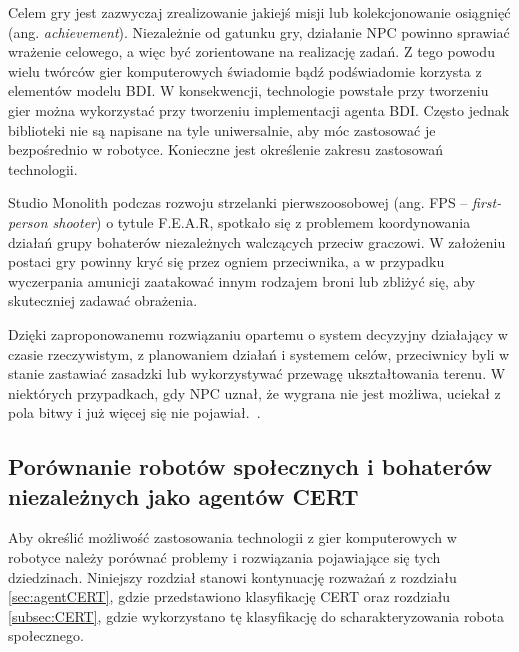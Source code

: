 Celem gry jest zazwyczaj zrealizowanie jakiejś misji lub kolekcjonowanie osiągnięć (ang. \textit{achievement}). Niezależnie od gatunku gry, działanie NPC powinno sprawiać wrażenie celowego, a więc być zorientowane na realizację zadań. Z tego powodu wielu twórców gier komputerowych świadomie bądź podświadomie korzysta z elementów modelu BDI. W konsekwencji,  technologie 
powstałe przy tworzeniu gier można wykorzystać przy tworzeniu implementacji agenta BDI.
Często jednak biblioteki nie są napisane na tyle uniwersalnie, aby móc zastosować je bezpośrednio w robotyce. Konieczne jest określenie zakresu zastosowań technologii.

Studio Monolith podczas rozwoju strzelanki pierwszoosobowej (ang. FPS – \textit{first-person shooter}) o tytule F.E.A.R, spotkało się z problemem koordynowania działań grupy bohaterów niezależnych walczących przeciw graczowi. W założeniu postaci gry powinny kryć się przez ogniem przeciwnika, a w przypadku wyczerpania amunicji zaatakować innym rodzajem broni lub zbliżyć się, aby skuteczniej zadawać obrażenia.

Dzięki zaproponowanemu rozwiązaniu opartemu o system decyzyjny działający w czasie rzeczywistym, z planowaniem działań i systemem celów, przeciwnicy byli w stanie zastawiać zasadzki lub wykorzystywać przewagę ukształtowania terenu. W niektórych przypadkach, gdy NPC uznał, że wygrana nie jest możliwa, uciekał z pola bitwy i już więcej się nie pojawiał.~\cite{ORKIfear}. 

\subsection{Porównanie robotów społecznych i bohaterów niezależnych jako agentów CERT}
\label{subsec:g_CERT}
Aby określić możliwość zastosowania technologii z gier komputerowych w robotyce należy porównać problemy i rozwiązania pojawiające się tych dziedzinach. Niniejszy rozdział stanowi kontynuację rozważań z rozdziału \ref{sec:agentCERT}, gdzie przedstawiono klasyfikację CERT oraz rozdziału \ref{subsec:CERT}, gdzie wykorzystano tę klasyfikację do scharakteryzowania robota społecznego.

